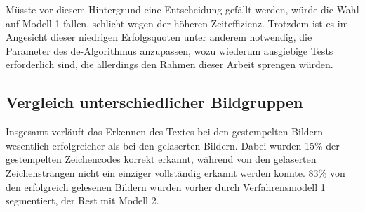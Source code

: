 			Müsste vor diesem Hintergrund eine Entscheidung gefällt werden, würde die Wahl auf Modell 1 fallen, schlicht wegen der höheren Zeiteffizienz. Trotzdem ist es im Angesicht dieser niedrigen Erfolgsquoten unter anderem notwendig, die Parameter des \gls{de}-Algorithmus anzupassen, wozu wiederum ausgiebige Tests erforderlich sind, die allerdings den Rahmen dieser Arbeit sprengen würden.
		
		\subsection{Vergleich unterschiedlicher Bildgruppen}
		\label{sub:comp-diff-images}
			Insgesamt verläuft das Erkennen des Textes bei den gestempelten Bildern wesentlich erfolgreicher als bei den gelaserten Bildern. Dabei wurden 15\% der gestempelten Zeichencodes korrekt erkannt, während von den gelaserten Zeichensträngen nicht ein einziger vollständig erkannt werden konnte. 83\% von den erfolgreich gelesenen Bildern wurden vorher durch Verfahrensmodell 1 segmentiert, der Rest mit Modell 2.
